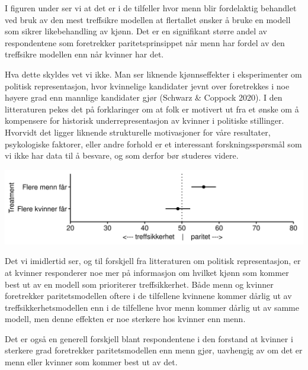 \documentclass[
]{book}
\begin{document}
I figuren under ser vi at det er i de tilfeller hvor menn blir fordelaktig behandlet ved bruk av den mest treffsikre modellen at flertallet ønsker å bruke en modell som sikrer likebehandling av kjønn.
Det er en signifikant større andel av respondentene som foretrekker paritetsprinsippet når menn har fordel av den treffsikre modellen enn når kvinner har det.

Hva dette skyldes vet vi ikke.
Man ser liknende kjønnseffekter i eksperimenter om politisk representasjon, hvor kvinnelige kandidater jevnt over foretrekkes i noe høyere grad enn mannlige kandidater gjør (Schwarz \& Coppock 2020).
I den litteraturen pekes det på forklaringer om at folk er motivert ut fra et ønske om å kompensere for historisk underrepresentasjon av kvinner i politiske stillinger.
Hvorvidt det ligger liknende strukturelle motivasjoner for våre resultater, psykologiske faktorer, eller andre forhold er et interessant forskningsspørsmål som vi ikke har data til å besvare, og som derfor bør studeres videre.

\includegraphics{figs/png/fig_parity_treat_avg.png}

Det vi imidlertid ser, og til forskjell fra litteraturen om politisk representasjon, er at kvinner responderer noe mer på informasjon om hvilket kjønn som kommer best ut av en modell som prioriterer treffsikkerhet.
Både menn og kvinner foretrekker paritetsmodellen oftere i de tilfellene kvinnene kommer dårlig ut av treffsikkerhetsmodellen enn i de tilfellene hvor menn kommer dårlig ut av samme modell, men denne effekten er noe sterkere hos kvinner enn menn.

Det er også en generell forskjell blant respondentene i den forstand at kvinner i sterkere grad foretrekker paritetsmodellen enn menn gjør, uavhengig av om det er menn eller kvinner som kommer best ut av det.
\end{document}
